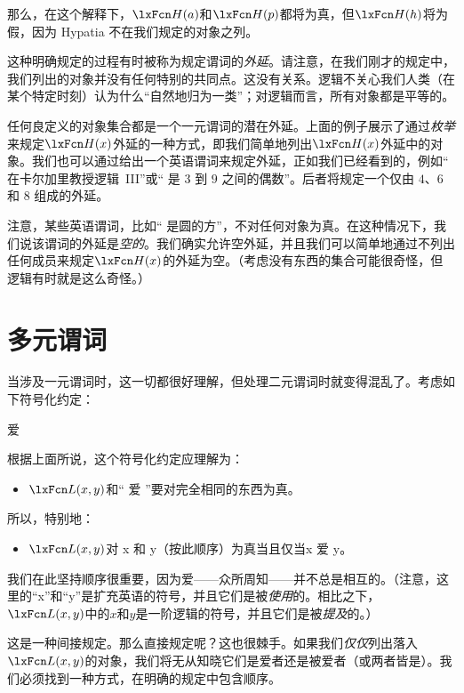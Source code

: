 那么，在这个解释下，$\atom{H}{a}$和$\atom{H}{p}$都将为真，但$\atom{H}{h}$将为假，因为 Hypatia 不在我们规定的对象之列。

这种明确规定的过程有时被称为规定谓词的\emph{外延}。请注意，在我们刚才的规定中，我们列出的对象并没有任何特别的共同点。这没有关系。逻辑不关心我们人类（在某个特定时刻）认为什么“自然地归为一类”；对逻辑而言，所有对象都是平等的。

任何良定义的对象集合都是一个一元谓词的潜在外延。上面的例子展示了通过\emph{枚举}来规定$\atom{H}{x}$外延的一种方式，即我们简单地列出$\atom{H}{x}$外延中的对象。我们也可以通过给出一个英语谓词来规定外延，正如我们已经看到的，例如“ 在卡尔加里教授逻辑~III”或“ 是 $3$ 到 $9$ 之间的偶数”。后者将规定一个仅由 $4$、$6$ 和 $8$ 组成的外延。

注意，某些英语谓词，比如“ 是圆的方”，不对任何对象为真。在这种情况下，我们说该谓词的外延是\emph{空的}。我们确实允许空外延，并且我们可以简单地通过不列出任何成员来规定$\atom{H}{x}$的外延为空。（考虑没有东西的集合可能很奇怪，但逻辑有时就是这么奇怪。）

\section{多元谓词}
当涉及一元谓词时，这一切都很好理解，但处理二元谓词时就变得混乱了。考虑如下符号化约定：

\begin{ekey}
		\item[\atom{L}{x,y}]  爱 
	\end{ekey}

根据上面所说，这个符号化约定应理解为：

\begin{itemize}
		\item$\atom{L}{x,y}$和“ 爱 ”要对完全相同的东西为真。
	\end{itemize}

所以，特别地：

\begin{itemize}
		\item$\atom{L}{x,y}$对 x 和 y（按此顺序）为真当且仅当x 爱 y。
	\end{itemize}

我们在此坚持顺序很重要，因为爱——众所周知——并不总是相互的。（注意，这里的“x”和“y”是扩充英语的符号，并且它们是被\emph{使用}的。相比之下，$\atom{L}{x,y}$中的$x$和$y$是一阶逻辑的符号，并且它们是被\emph{提及}的。）

这是一种间接规定。那么直接规定呢？这也很棘手。如果我们\emph{仅仅}列出落入$\atom{L}{x,y}$的对象，我们将无从知晓它们是爱者还是被爱者（或两者皆是）。我们必须找到一种方式，在明确的规定中包含顺序。

